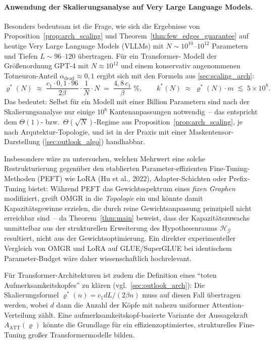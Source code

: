 \documentclass[12pt, a4paper, openany]{report}
\newcommand{\calG}{\mathcal{G}}
\newcommand{\calH}{\mathcal{H}}
\begin{document}
\paragraph{Anwendung der Skalierungsanalyse auf Very Large Language Models.}
Besonders bedeutsam ist die Frage, wie sich die Ergebnisse von
Proposition~\ref{prop:arch_scaling} und Theorem~\ref{thm:few_edges_guarantee}
auf heutige Very Large Language Models (VLLMs) mit $N \sim 10^{10}$--$10^{12}$
Parametern und Tiefen $L \sim 96$--$120$ übertragen.  Für ein Transformer-
Modell der Größenordnung GPT-4 mit $N \approx 10^{12}$ und einem konservativ
angenommenen Totneuron-Anteil $\alpha_{\mathrm{dead}} \approx 0{,}1$ ergibt
sich mit den Formeln aus \cref{sec:scaling_arch}:
\[
  \varrho^*(N)
  \;\approx\; \frac{c_1 \cdot 0{,}1 \cdot 96}{2\beta}
  \cdot \frac{1}{N} \cdot N
  \;=\; \frac{4{,}8\,c_1}{\beta}\;\%,
  \qquad
  k^*(N) \;\approx\; \varrho^*(N)\cdot m \;\lesssim\; 5 \times 10^{8}.
\]
Das bedeutet: Selbst für ein Modell mit einer Billion Parametern sind nach
der Skalierungsanalyse nur einige $10^8$ Kanten\-anpassungen notwendig~--
das entspricht dem $\Theta(1)$- bzw.\ $\Theta(\sqrt{N})$-Regime aus
Proposition~\ref{prop:arch_scaling}, je nach Arqutektur-Topologie, und ist
in der Praxis mit einer Masken\-tensor-Darstellung (\cref{sec:outlook_algo})
handhabbar.

Insbesondere wäre zu untersuchen, welchen Mehrwert eine solche Restrukturierung
gegenüber den etablierten Parameter-effizienten Fine-Tuning-Methoden (PEFT)
wie LoRA (Hu et al., 2022), Adapter-Schichten oder Prefix-Tuning bietet:
Während PEFT das Gewichtsspektrum eines \emph{fixen Graphen} modifiziert,
greift OMGR in die \emph{Topologie} ein und könnte damit Kapazitätsgewinne
erzielen, die durch reine Gewichts\-anpassung prinzipiell nicht erreichbar
sind~-- da Theorem~\ref{thm:main} beweist, dass der Kapazitätszuwachs
unmittelbar aus der strukturellen Erweiterung des Hypothesenraums
$\calH_{\calG}$ resultiert, nicht aus der Gewichtsoptimierung.  Ein
direkter experimenteller Vergleich von OMGR und LoRA auf GLUE/SuperGLUE
bei identischem Parameter-Budget wäre daher wissenschaftlich hochrelevant.

Für Transformer-Architekturen ist zudem die Definition eines ``toten
Aufmerksamkeitskopfes'' zu klären (vgl.\ \cref{sec:outlook_arch}): Die
Skalierungsformel $\varrho^*(n) = c_1 dL / (2\beta n)$ muss auf diesen
Fall übertragen werden, wobei $d$ dann die Anzahl der Köpfe mit nahezu
uniformer Attention-Verteilung zählt.  Eine aufmerksamkeitskopf-basierte
Variante der Aussagekraft $A_{\mathrm{ATT}}(\varrho)$ könnte die
Grundlage für ein effizienzoptimiertes, strukturelles Fine-Tuning großer
Transformermodelle bilden.
\end{document}
